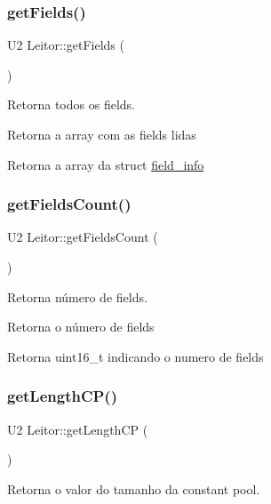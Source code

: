 \subsubsection{\texorpdfstring{get\+Fields()}{getFields()}}
{\footnotesize\ttfamily U2 Leitor\+::get\+Fields (\begin{DoxyParamCaption}{ }\end{DoxyParamCaption})}



Retorna todos os fields. 

Retorna a array com as fields lidas \begin{DoxyReturn}{Retorna}
a array da struct \hyperlink{structfield__info}{field\+\_\+info} 
\end{DoxyReturn}
\mbox{\label{classLeitor_a59287cad03c19ca411b7befce0008870}} 
\subsubsection{\texorpdfstring{get\+Fields\+Count()}{getFieldsCount()}}
{\footnotesize\ttfamily U2 Leitor\+::get\+Fields\+Count (\begin{DoxyParamCaption}{ }\end{DoxyParamCaption})}



Retorna número de fields. 

Retorna o número de fields \begin{DoxyReturn}{Retorna}
uint16\+\_\+t indicando o numero de fields 
\end{DoxyReturn}
\mbox{\label{classLeitor_a53b7aac0c6d2b75104c6d53abd23b37e}} 
\subsubsection{\texorpdfstring{get\+Length\+C\+P()}{getLengthCP()}}
{\footnotesize\ttfamily U2 Leitor\+::get\+Length\+CP (\begin{DoxyParamCaption}{ }\end{DoxyParamCaption})}



Retorna o valor do tamanho da constant pool. 

